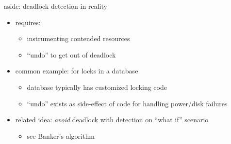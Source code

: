 
\begin{frame}{aside: deadlock detection in reality}
    \begin{itemize}
    \item requires:
        \begin{itemize}
        \item instrumenting contended resources
        \item ``undo'' to get out of deadlock
        \end{itemize}
        \vspace{.5cm}
    \item common example: for locks in a database
        \begin{itemize}
        \item database typically has customized locking code
        \item ``undo'' exists as side-effect of code for handling power/disk failures
        \end{itemize}
    \item related idea: \textit{avoid} deadlock with detection on ``what if''  scenario
        \begin{itemize}
        \item see Banker's algorithm
        \end{itemize}
    \end{itemize}
\end{frame}
